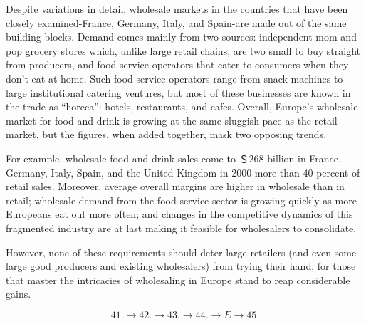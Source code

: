 \qquad [E] Despite variations in detail, wholesale markets in the countries that have been closely examined-France, Germany, Italy, and Spain-are made out of the same building blocks. Demand comes mainly from two sources: independent mom-and-pop grocery stores which, unlike large retail chains, are two small to buy straight from producers, and food service operators that cater to consumers when they don’t eat at home. Such food service operators range from snack machines to large institutional catering ventures, but most of these businesses are known in the trade as “horeca”: hotels, restaurants, and cafes. Overall, Europe’s wholesale market for food and drink is growing at the same sluggish pace as the retail market, but the figures, when added together, mask two opposing trends.

\qquad [F] For example, wholesale food and drink sales come to ＄268 billion in France, Germany, Italy, Spain, and the United Kingdom in 2000-more than 40 percent of retail sales. Moreover, average overall margins are higher in wholesale than in retail; wholesale demand from the food service sector is growing quickly as more Europeans eat out more often; and changes in the competitive dynamics of this fragmented industry are at last making it feasible for wholesalers to consolidate.

\qquad [G] However, none of these requirements should deter large retailers (and even some large good producers and existing wholesalers) from trying their hand, for those that master the intricacies of wholesaling in Europe stand to reap considerable gains.

\[41. \to 42. \to 43. \to 44. \to E \to 45.\]